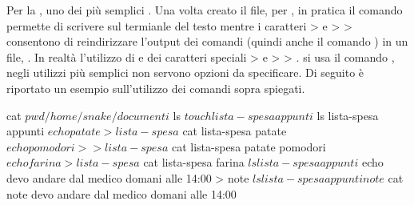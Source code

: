 Per la , uno dei più semplici . Una volta creato il file, per , in pratica il comando  permette di scrivere sul termianle del testo mentre i caratteri > e > > consentono di reindirizzare l'output dei comandi (quindi anche il comando ) in un file, . In realtà l'utilizzo di  e dei caratteri speciali > e > > .  si usa il comando , negli utilizzi più semplici non servono opzioni da specificare. Di seguito è riportato un esempio sull'utilizzo dei comandi sopra spiegati.
\begin{cmdc}{}{cat}
	$ pwd
	/home/snake/documenti
	$ ls
	$ touch lista-spesa appunti
	$ ls
	lista-spesa appunti
	$ echo patate > lista-spesa
	$ cat lista-spesa
	patate
	$ echo pomodori >> lista-spesa
	$ cat lista-spesa
	patate
	pomodori
	$ echo farina > lista-spesa
	$ cat lista-spesa
	farina
	$ ls
	lista-spesa appunti
	$ echo devo andare dal medico domani alle 14:00 > note
	$ ls
	lista-spesa appunti note
	$ cat note
	devo andare dal medico domani alle 14:00
\end{cmdc}

